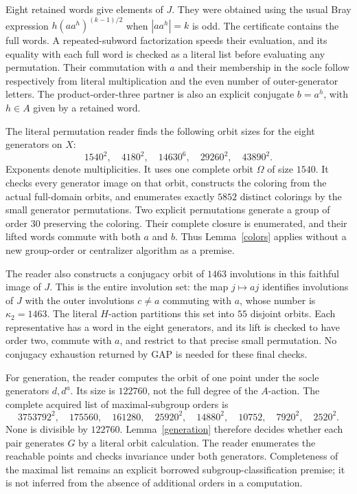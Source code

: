 \documentclass[11pt,a4paper]{article}
\begin{document}
Eight retained words give elements of $J$. They were obtained using the
usual Bray expression $h(aa^h)^{(k-1)/2}$ when $|aa^h|=k$ is odd.
The certificate contains the full words. A repeated-subword factorization
speeds their evaluation, and its equality with each full word is checked
as a literal list before evaluating any permutation. Their commutation
with $a$ and their membership in the socle follow respectively from
literal multiplication and the even number of outer-generator letters.
The product-order-three partner is also an explicit conjugate $b=a^h$,
with $h\in A$ given by a retained word.

The literal permutation reader finds the following orbit sizes for the
eight generators on $X$:
\[
 1540^2,\quad4180^2,\quad14630^6,\quad29260^2,\quad43890^2.
\]
Exponents denote multiplicities. It uses one complete orbit $\Omega$ of
size $1540$. It checks every generator image on that orbit, constructs
the coloring from the actual full-domain orbits, and enumerates exactly
$5852$ distinct colorings by the small generator permutations. Two
explicit permutations generate a group of order $30$ preserving the
coloring. Their complete closure is enumerated, and their lifted words
commute with both $a$ and $b$. Thus Lemma~\ref{colors} applies without a
new group-order or centralizer algorithm as a premise.

The reader also constructs a conjugacy orbit of $1463$ involutions in
this faithful image of $J$. This is the entire involution set: the map
$j\mapsto aj$ identifies involutions of $J$ with the outer involutions
$c\ne a$ commuting with $a$, whose number is $\kappa_2=1463$.
The literal $H$-action partitions this set into $55$ disjoint orbits.
Each representative has a word in the eight generators, and its lift is
checked to have order two, commute with $a$, and restrict to that precise
small permutation. No conjugacy exhaustion returned by GAP is needed
for these final checks.

For generation, the reader computes the orbit of one point under the
socle generators $d,d^a$. Its size is $122760$, not the full degree of
the $A$-action. The complete acquired list of maximal-subgroup orders is
\[
 3753792^2,\quad175560,\quad161280,\quad25920^2,\quad14880^2,
 \quad10752,\quad7920^2,\quad2520^2.
\]
None is divisible by $122760$. Lemma~\ref{generation} therefore decides
whether each pair generates $G$ by a literal orbit calculation. The
reader enumerates the reachable points and checks invariance under both
generators. Completeness of the maximal list remains an explicit
borrowed subgroup-classification premise; it is not inferred from the
absence of additional orders in a computation.
\end{document}
